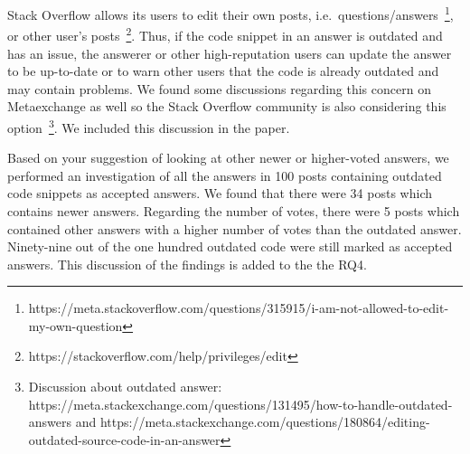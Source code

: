 \documentclass[a4paper,twoside,10pt]{reviewresponse}
\begin{document}

Stack Overflow allows its users to edit their own posts, i.e.~questions/answers~\footnote{https://meta.stackoverflow.com/questions/315915/i-am-not-allowed-to-edit-my-own-question}, or other user's posts~\footnote{https://stackoverflow.com/help/privileges/edit}. Thus, if the code snippet in an answer is outdated and has an issue, the answerer or other high-reputation users can update the answer to be up-to-date or to warn other users that the code is already outdated and may contain problems. We found some discussions regarding this concern on Metaexchange as well so the Stack Overflow community is also considering this option~\footnote{Discussion about outdated answer: https://meta.stackexchange.com/questions/131495/how-to-handle-outdated-answers and https://meta.stackexchange.com/questions/180864/editing-outdated-source-code-in-an-answer}. We included this discussion in the paper.

Based on your suggestion of looking at other newer or higher-voted answers, we performed an investigation of all the answers in 100 posts containing outdated code snippets as accepted answers. We found that there were 34 posts which contains newer answers. Regarding the number of votes, there were 5 posts which contained other answers with a higher number of votes than the outdated answer. Ninety-nine out of the one hundred outdated code were still marked as accepted answers. 
This discussion of the findings is added to the the RQ4.
		
\end{document}
